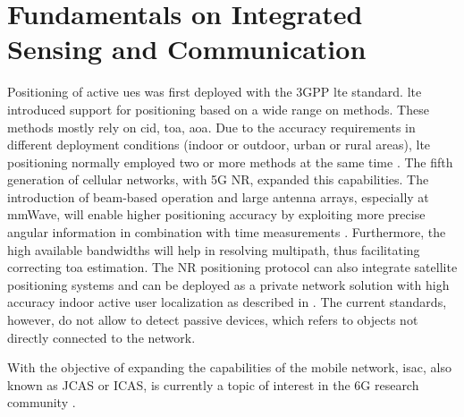 \chapter{Fundamentals on Integrated Sensing and Communication}
		
		
		
\alert{Positioning of active \glspl{ue} was first deployed with the \gls{3GPP} \Gls{lte} standard.} \gls{lte} introduced support for positioning based on a wide range on methods. 
These methods mostly rely on \gls{cid}, \gls{toa}, \gls{aoa}. Due to the accuracy requirements in different deployment conditions (\ie indoor or outdoor, urban or rural areas), \gls{lte} positioning normally employed two or more methods at the same time \cite{Razavi_Gunnarsson_2018}.
The fifth generation of cellular networks, with 5G \gls{NR}, expanded this capabilities. The introduction of beam-based operation and large antenna arrays, especially at mmWave, will enable higher positioning accuracy by exploiting more precise angular information in combination with time measurements \cite{Keating_Saily_Hulkkonen_Karjalainen_2019}.
Furthermore, the high available bandwidths will help in resolving multipath, thus facilitating correcting \gls{toa} estimation.
The \gls{NR} positioning protocol can also integrate satellite positioning systems and can be deployed as a private network solution with high accuracy indoor active user localization as described in  \cite{Henninger_Abrudan_Mandelli_Arnold_Saur_Kolmonen_Klein_Schlitter_Brink_2022}. 
The current standards, however, do not allow to detect passive devices, which refers to objects not directly connected to the network.

With the objective of expanding the capabilities of the mobile network, \gls{isac}, also known as JCAS or ICAS, is currently a topic of interest in the 6G research community \cite{Mandelli_Henninger_Bauhofer_Wild_2023}.

